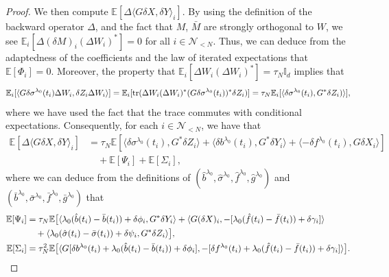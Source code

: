 \documentclass[11pt]{article}
\numberwithin{equation}{section}
\theoremstyle{definition}
\theoremstyle{remark}
\def\l{\label}  \def\f{\frac}  \def\fa{\forall}
\def \la{\langle} \def\ra{\rangle}
\def\cN{\mathcal{N}}
\def\sE{{\mathbb{E}}}
\def\sI{{\mathbb{I}}}
\newcommand{\tr}{\textnormal{tr}}
\begin{document}
\begin{proof}
  We then compute  $\sE[\Delta \la G\delta X,\delta Y\ra_i]$.
By using the  definition of the backward operator $\Delta$,
and
the fact that 
  $M$, $\bar{M}$ are strongly orthogonal to  $W$,
we see 
$\sE_i[ \Delta (\delta M)_i(\Delta W_i)^*]=0$ for all $i\in \cN_{<N}$.
Thus, we can  deduce from the adaptedness of the coefficients
and the law of iterated expectations
 that 
$\sE[\Phi_i]=0$.
Moreover, the property that $\sE_i[\Delta W_i (\Delta W_i)^*]=\tau_N\sI_d$ 
implies that
$$
\sE_i[\la G\delta \sigma^{\lambda_0}(t_i)\Delta W_i,\delta Z_i\Delta W_i\ra]
=\sE_i[\tr(\Delta W_i(\Delta W_i)^*(G\delta \sigma^{\lambda_0}(t_i))^*\delta Z_i)]
=\tau_N\sE_i[\la \delta \sigma^{\lambda_0}(t_i),G^*\delta Z_i)\ra ],
$$
where we have used the fact that  the trace
commutes with conditional expectations.
Consequently, 
for each $i\in \cN_{<N}$, 
we have that
\begin{align*}
\sE[\Delta \la G\delta X,\delta Y\ra_i]
&=\tau_N
\sE[
\la \delta \sigma^{\lambda_0}(t_i),G^*\delta Z_i\ra
 +\la  \delta b^{\lambda_0}(t_{i}),G^*\delta Y_{i} \ra
+ \la -\delta f^{\lambda_0}(t_{i}),G\delta X_{i}\ra
 ]
\\
&\quad 
 +\sE[\Psi_i]+\sE[\Sigma_i],
\end{align*}
where we can deduce from the definitions of $(\hat{b}^{\lambda_0},\hat{\sigma}^{\lambda_0},\hat{f}^{\lambda_0},\hat{g}^{\lambda_0})$ 
  and $(\bar{b}^{\lambda_0},\bar{\sigma}^{\lambda_0},\bar{f}^{\lambda_0},\bar{g}^{\lambda_0})$
  that
 \begin{align}
\sE[\Psi_i]
&=
\tau_N\sE\big[
\la \lam_0(\hat{b}(t_{i})-\bar{b}(t_{i}))+\delta \phi_{i}, G^*\delta Y_{i}\ra
+\la  G (\delta X)_i, -[{\lambda_0}(\hat{f}(t_{i})-\bar{f}(t_{i}))+\delta \gamma_i] \ra
\nb
\\
& \quad
+ \la {\lambda_0}(\hat{\sigma}(t_i)-\bar{\sigma}(t_i))+\delta \psi_{i}, 
G^*\delta  {Z}_i\ra
\big],  
 \l{eq:exp_Psi}
\\
\sE[\Sigma_i]
&=
\tau_N^2
\sE\big[
\la  G [\delta b^{\lambda_0}(t_{i})+{\lambda_0}(\hat{b}(t_{i})-\bar{b}(t_{i}))+\delta \phi_{i}],
-[\delta f^{\lambda_0}(t_{i})+{\lambda_0}(\hat{f}(t_{i})-\bar{f}(t_{i}))+\delta \gamma_i]
\ra
\big].
 \l{eq:exp_Sigma}
 \end{align}

  
  



\end{proof}
\end{document}
